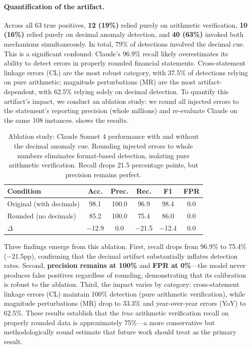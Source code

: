 \documentclass[11pt]{article}
\begin{document}
\paragraph{Quantification of the artifact.}
Across all 63 true positives, \textbf{12 (19\%)} relied purely on arithmetic verification, \textbf{10 (16\%)} relied purely on decimal anomaly detection, and \textbf{40 (63\%)} invoked both mechanisms simultaneously.
In total, 79\% of detections involved the decimal cue.
This is a significant confound: Claude's 96.9\% recall likely overestimates its ability to detect errors in properly rounded financial statements.
Cross-statement linkage errors (CL) are the most robust category, with 37.5\% of detections relying on pure arithmetic; magnitude perturbations (MR) are the most artifact-dependent, with 62.5\% relying solely on decimal detection.
To quantify this artifact's impact, we conduct an ablation study: we round all injected errors to the statement's reporting precision (whole millions) and re-evaluate Claude on the same 108 instances.
 shows the results.

\begin{table}[t]
\centering
\footnotesize
\caption{Ablation study: Claude Sonnet 4 performance with and without the decimal anomaly cue.
Rounding injected errors to whole numbers eliminates format-based detection, isolating pure arithmetic verification.
Recall drops 21.5 percentage points, but precision remains perfect.}
\label{tab:rounded_ablation}
\begin{tabular}{lccccc}
\toprule
\textbf{Condition} & \textbf{Acc.} & \textbf{Prec.} & \textbf{Rec.} & \textbf{F1} & \textbf{FPR} \\
\midrule
Original (with decimals) & 98.1 & 100.0 & 96.9 & 98.4 & 0.0 \\
Rounded (no decimals)    & 85.2 & 100.0 & 75.4 & 86.0 & 0.0 \\
\midrule
$\Delta$                 & $-$12.9 & 0.0 & $-$21.5 & $-$12.4 & 0.0 \\
\bottomrule
\end{tabular}
\end{table}

Three findings emerge from this ablation.
First, recall drops from 96.9\% to 75.4\% ($-$21.5pp), confirming that the decimal artifact substantially inflates detection rates.
Second, \textbf{precision remains at 100\%} and \textbf{FPR at 0\%}---the model never produces false positives regardless of rounding, demonstrating that its calibration is robust to the ablation.
Third, the impact varies by category: cross-statement linkage errors (CL) maintain 100\% detection (pure arithmetic verification), while magnitude perturbations (MR) drop to 33.3\% and year-over-year errors (YoY) to 62.5\%.
These results establish that the \emph{true} arithmetic verification recall on properly rounded data is approximately 75\%---a more conservative but methodologically sound estimate that future work should treat as the primary result.
\end{document}
